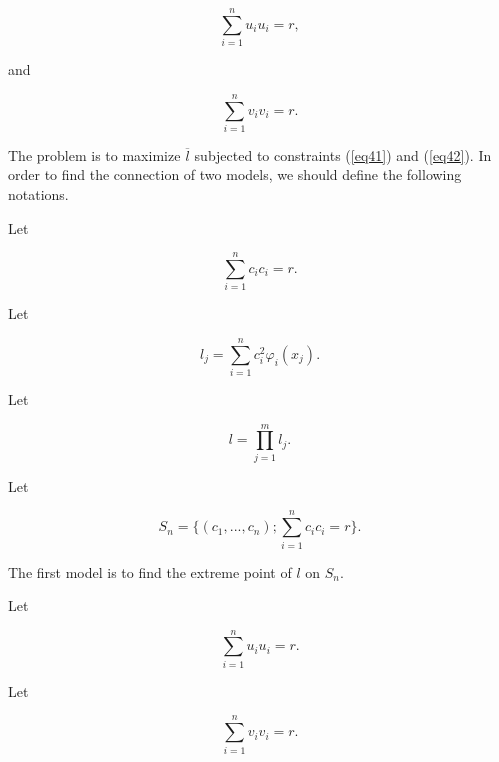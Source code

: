 \documentclass [18pt]{article}
\begin{document}
\begin{equation}
\label{eq41}
\sum\limits_{i = 1}^n {u_i u_i } = r,
\end{equation}



\noindent
and


\begin{equation}
\label{eq42}
\sum\limits_{i = 1}^n {v_i v_i } = r.
\end{equation}



The problem is to maximize $\overline l $ subjected to constraints (\ref{eq41}) and
(\ref{eq42}). In order to find the connection of two models, we should define the
following notations.

Let


\begin{equation}
\label{eq43}
\sum\limits_{i = 1}^n {c_i } c_i = r.
\end{equation}



Let


\begin{equation}
\label{eq44}
l_j = \sum\limits_{i = 1}^n {c_i^2 \varphi _i (x_j )} .
\end{equation}



Let


\begin{equation}
\label{eq45}
l = \prod\limits_{j = 1}^m {l_j } .
\end{equation}



Let


\begin{equation}
\label{eq46}
S_n = \{(c_1 ,...,c_n );\sum\limits_{i = 1}^n {c_i } c_i = r\}.
\end{equation}



The first model is to find the extreme point of $l$ on $S_n $.

Let


\begin{equation}
\label{eq47}
\sum\limits_{i = 1}^n {u_i } u_i = r.
\end{equation}



Let


\begin{equation}
\label{eq48}
\sum\limits_{i = 1}^n {v_i } v_i = r.
\end{equation}
\end{document}
